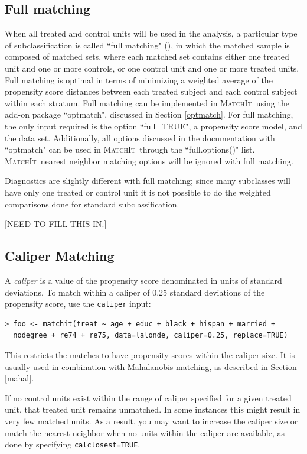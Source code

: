 \documentclass[oneside,letterpaper,titlepage]{article}
\newcommand{\MatchIt}{\textsc{MatchIt}}
\begin{document}
\subsection{Full matching}
When all treated and control units will be used in the analysis, a particular type of subclassification is called
``full matching"  (\cite{Rosenbaum02, Hansen04}), in which the matched sample is composed of matched sets, where
each matched set contains either one treated unit and one or more controls, or one control unit and one or more
treated units.  Full matching is optimal in terms of minimizing a weighted average of the propensity score distances between
each treated subject and each control subject within each stratum.  Full matching can be implemented in \MatchIt\ using
the add-on package ``optmatch", discussed in Section \ref{optmatch}.  For full matching, the only input required is the
option ``full=TRUE", a propensity score model, and the data set.  Additionally, all 
options discussed in the documentation with
``optmatch" can be used in \MatchIt\ through the ``full.options()" list.  \MatchIt\ nearest neighbor matching options
will be ignored with full matching.

Diagnostics are slightly different with full matching; since many subclasses will have only one treated or control unit it 
is not possible to do the weighted comparisons done for standard subclassification.  

[NEED TO FILL THIS IN.]

\subsection{Caliper Matching}

A \emph{caliper} is a value of the propensity score denominated in
units of standard deviations.  To match within a caliper of 0.25
standard deviations of the propensity score, use the \texttt{caliper}
input:

\begin{verbatim}
> foo <- matchit(treat ~ age + educ + black + hispan + married +
  nodegree + re74 + re75, data=lalonde, caliper=0.25, replace=TRUE)
\end{verbatim}

This restricts the matches to have propensity scores within the
caliper size.  It is usually used in combination with Mahalanobis
matching, as described in Section \ref{mahal}.

If no control units exist within the range of caliper specified for
a given treated unit, that
treated unit remains unmatched.  In some instances this might result
in very few matched units.  As a result, you may want to increase the
caliper size or match the nearest neighbor when no units within
the caliper are available, as done by specifying
\texttt{calclosest=TRUE}.
\end{document}
